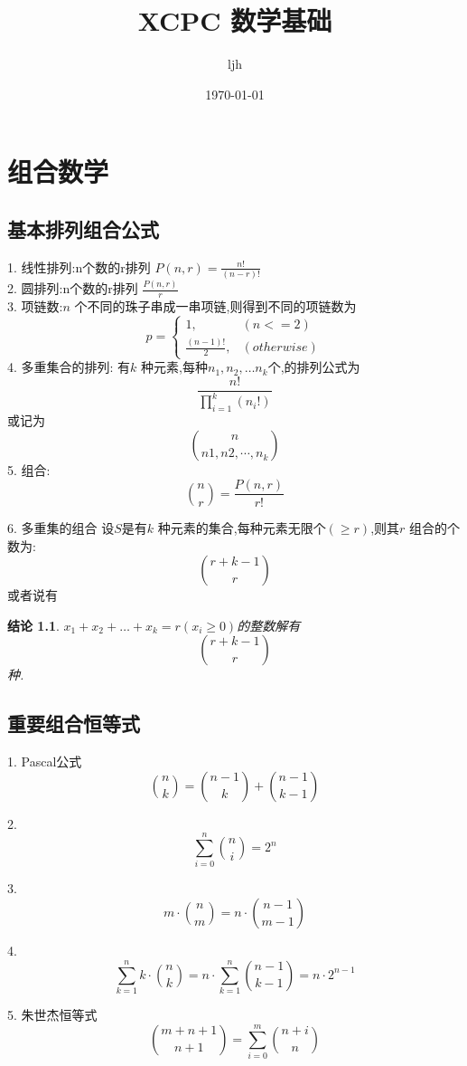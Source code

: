 \documentclass[12pt, a4paper, oneside]{ctexbook}
\title{{\Huge{\textbf{XCPC 数学基础}}}}
\author{ljh}
\date{\today}
\newtheorem{proposition}[theorem]{结论}
\newcommand{\newp}[1]{\vspace{#1\baselineskip}\noindent}
\begin{document}
\maketitle

\setcounter{page}{1}

\newpage
{}
\setcounter{page}{1}
\tableofcontents
\newpage
\setcounter{page}{1}

\chapter{组合数学}

\section{基本排列组合公式}
1. 线性排列:n个数的r排列 $P(n,r)=\frac{n!}{(n-r)!}$\\
2. 圆排列:n个数的r排列 $\frac{P(n,r)}{r}$\\
3. 项链数:$n$ 个不同的珠子串成一串项链,则得到不同的项链数为
$$
p=\begin{cases}
  1,& \left( n<=2\right) \\
  \frac{(n-1)!}{2},& \left( otherwise\right)
  \end{cases}
$$
4. 多重集合的排列: 有$k$ 种元素,每种$n_1,n_2,\dots n_k$个,的排列公式为
$$
\frac{n!}{\prod_{i=1}^{k}\left(n_i!\right)} 
$$
或记为
$$
\binom{n}{n1,n2,\cdots,n_k} 
$$
5. 组合: 
$$
\binom{n}{r}=\frac{P(n,r)}{r!} 
$$

6. 多重集的组合
设$S$是有$k$ 种元素的集合,每种元素无限个$(\geq r)$,则其$r$ 组合的个数为:
$$
\binom{r+k-1}{r} 
$$
或者说有
\begin{proposition}
$x_1+x_2+\dots+x_k=r(x_i\geq 0)$的整数解有
$$
\binom{r+k-1}{r} 
$$
种.
\end{proposition}

\newp{3}

\section{重要组合恒等式}
1. Pascal公式
$$
\binom{n}{k}=\binom{n-1}{k}+\binom{n-1}{k-1} 
$$

2.
$$
\sum_{i=0}^{n} \binom{n}{i}=2^n 
$$

3. 
$$
 m\cdot \binom{n}{m}=n\cdot \binom{n-1}{m-1}
$$

4.
$$ 
\sum_{k=1}^{n} k\cdot\binom{n}{k}=n\cdot \sum_{k=1}^{n}\binom{n-1}{k-1}=n\cdot2^{n-1} 
$$

5. 朱世杰恒等式
$$
\binom{m+n+1}{n+1}=\sum_{i=0}^{m} \binom{n+i}{n}
$$
\end{document}
